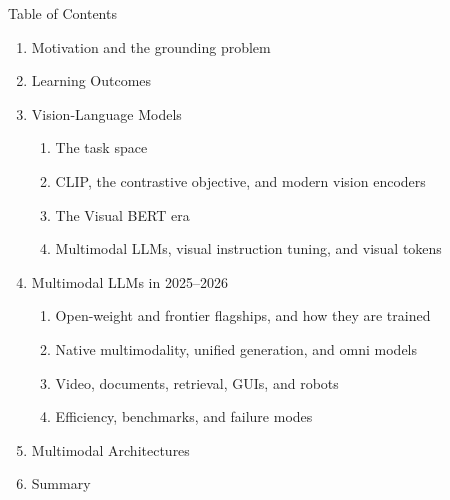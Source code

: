 \begin{frame}{Table of Contents}
  \small
  \begin{enumerate}
    \item Motivation and the grounding problem
    \item Learning Outcomes
    \item Vision-Language Models
      \begin{enumerate}
        \item The task space
        \item CLIP, the contrastive objective, and modern vision encoders
        \item The Visual BERT era
        \item Multimodal LLMs, visual instruction tuning, and visual tokens
      \end{enumerate}
    \item Multimodal LLMs in 2025--2026
      \begin{enumerate}
        \item Open-weight and frontier flagships, and how they are trained
        \item Native multimodality, unified generation, and omni models
        \item Video, documents, retrieval, GUIs, and robots
        \item Efficiency, benchmarks, and failure modes
      \end{enumerate}
    \item Multimodal Architectures
    \item Summary
  \end{enumerate}
\end{frame}
